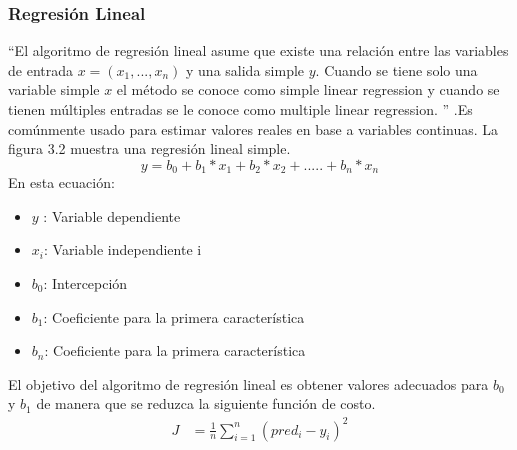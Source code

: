 \subsubsection*{Regresión Lineal}
\textquotedblleft El algoritmo de regresión lineal asume que existe una relación entre las variables de entrada $x=(x_{1},...,x_{n})$ y una salida simple $y$.  Cuando se tiene solo una variable simple $x$ el método se conoce como simple linear regression y cuando se tienen múltiples entradas se le conoce como multiple linear regression.  \textquotedblright \cite{WEBSITE:3} .Es comúnmente usado para estimar valores reales en base a variables continuas. La figura 3.2 muestra una regresión lineal simple.
\begin{equation}
\label{Simple learning regression}
y=b_{0}+b_{1}*x_{1}+b_{2}*x_{2}+.....+b_{n}*x_{n}
\end{equation} 
En esta ecuación:
\begin{itemize}
	\item $y$    : Variable dependiente
	\item $x_{i}$: Variable independiente i
	\item $b_{0}$: Intercepción
	\item $b_{1}$: Coeficiente para la primera característica
	\item $b_{n}$: Coeficiente para la primera característica
	
\end{itemize}
El objetivo del algoritmo de regresión lineal es obtener valores adecuados para $b_{0}$ y $b_{1}$ de manera que se reduzca la siguiente función de costo.
 \begin{equation}
 \label{eq:T3}
 \begin{aligned}
 J&=\frac{1}{n} \sum_{i=1}^{n}(pred_{i}-y_{i})^2
 \end{aligned}
 \end{equation}


